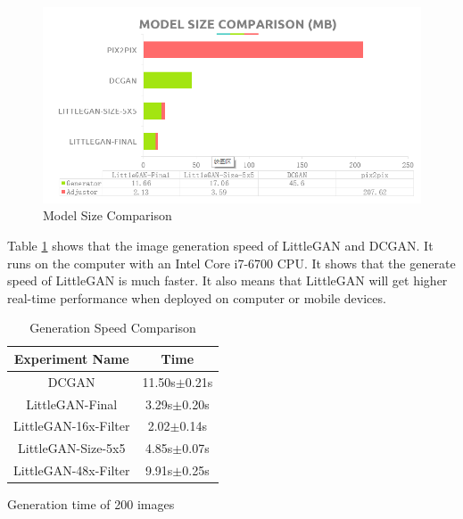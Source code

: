     \begin{figure}
        \begin{center}
        \includegraphics[width=\textwidth]{figures/result_model_size.png}
        \caption{Model Size Comparison}
        \label{result_model_size}
        \end{center}
    \end{figure}

Table \ref{result_speed} shows that the image generation speed of LittleGAN and DCGAN.
It runs on the computer with an Intel Core i7-6700 CPU.
It shows that the generate speed of LittleGAN is much faster.
It also means that LittleGAN will get higher real-time performance when deployed on computer or mobile devices.

    \begin{table}
        \caption{Generation Speed Comparison}
        \label{result_speed}
        \centering
        \begin{threeparttable}
            \begin{tabular}{c|c}
                \hline
                Experiment Name & Time       \\ \hline
                DCGAN        &  11.50s$\pm$0.21s\\
                LittleGAN-Final        &  3.29s$\pm$0.20s\\
                LittleGAN-16x-Filter       & 2.02$\pm$0.14s \\
                LittleGAN-Size-5x5        &  4.85s$\pm$0.07s\\
                LittleGAN-48x-Filter        & 9.91s$\pm$0.25s  \\ \hline
            \end{tabular}
            \begin{tablenotes}
                \item Generation time of 200 images
            \end{tablenotes}
        \end{threeparttable}
    \end{table}


